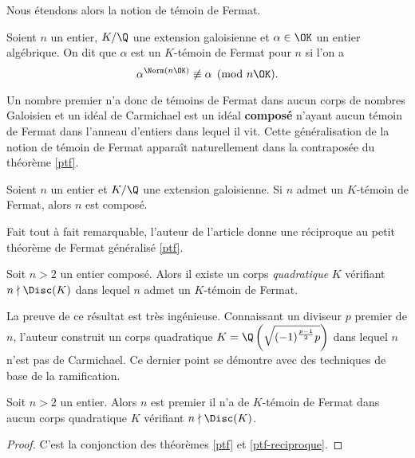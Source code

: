 Nous étendons alors la notion de témoin de Fermat.

\begin{definition}
	Soient $n$ un entier, $K/\Q$ une extension galoisienne et $\alpha\in \OK$ un entier algébrique. On dit que $\alpha$ est un $K$-témoin de Fermat pour $n$ si l'on a \[\alpha^{\Norm(n\OK)} \not \equiv \alpha \pmod{n\OK}.\]
\end{definition}

Un nombre premier n'a donc de témoins de Fermat dans aucun corps de nombres Galoisien et un idéal de Carmichael est un idéal \textbf{composé} n'ayant aucun témoin de Fermat dans l'anneau d'entiers dans lequel il vit. Cette généralisation de la notion de témoin de Fermat apparaît naturellement dans la contraposée du théorème \ref{ptf}.

\begin{theoreme}\label{ptf-contraposee}
	Soient $n$ un entier et $K/\Q$ une extension galoisienne. Si $n$ admet un $K$-témoin de Fermat, alors $n$ est composé.
\end{theoreme}

Fait tout à fait remarquable, l'auteur de l'article donne une réciproque au petit théorème de Fermat généralisé \ref{ptf}.

\begin{theoreme}
	Soit $n>2$ un entier composé. Alors il existe un corps \emph{quadratique} $K$ vérifiant $n\nmid \Disc(K)$ dans lequel $n$ admet un $K$-témoin de Fermat.
\end{theoreme}

\begin{MotSurPreuve}
	La preuve de ce résultat est très ingénieuse. Connaissant un diviseur $p$ premier de $n$, l'auteur construit un corps quadratique $K = \Q\left(\sqrt{(-1)^\frac{p-1}{2} p}\right)$ dans lequel $n$ n'est pas de Carmichael. Ce dernier point se démontre avec des techniques de base de la ramification. \\
\end{MotSurPreuve}

\begin{theoreme}\label{ptf-reciproque}
	Soit $n>2$ un entier. Alors $n$ est premier \ssi il n'a de $K$-témoin de Fermat dans aucun corps quadratique $K$ vérifiant $n\nmid \Disc(K)$.
\end{theoreme}

\begin{proof}
	C'est la conjonction des théorèmes \ref{ptf} et \ref{ptf-reciproque}.
\end{proof}

